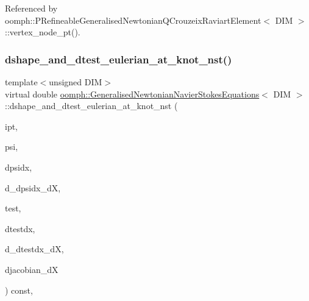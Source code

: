 Referenced by oomph\+::\+P\+Refineable\+Generalised\+Newtonian\+Q\+Crouzeix\+Raviart\+Element$<$ D\+I\+M $>$\+::vertex\+\_\+node\+\_\+pt().

\mbox{\label{classoomph_1_1GeneralisedNewtonianNavierStokesEquations_a24a93b73dba66e04eabb9b37a9360daa}} 
\subsubsection{\texorpdfstring{dshape\+\_\+and\+\_\+dtest\+\_\+eulerian\+\_\+at\+\_\+knot\+\_\+nst()}{dshape\_and\_dtest\_eulerian\_at\_knot\_nst()}\hspace{0.1cm}{\footnotesize\ttfamily [2/2]}}
{\footnotesize\ttfamily template$<$unsigned D\+IM$>$ \\
virtual double \hyperlink{classoomph_1_1GeneralisedNewtonianNavierStokesEquations}{oomph\+::\+Generalised\+Newtonian\+Navier\+Stokes\+Equations}$<$ D\+IM $>$\+::dshape\+\_\+and\+\_\+dtest\+\_\+eulerian\+\_\+at\+\_\+knot\+\_\+nst (\begin{DoxyParamCaption}\item[{const unsigned \&}]{ipt,  }\item[{\hyperlink{classoomph_1_1Shape}{Shape} \&}]{psi,  }\item[{\hyperlink{classoomph_1_1DShape}{D\+Shape} \&}]{dpsidx,  }\item[{\hyperlink{classoomph_1_1RankFourTensor}{Rank\+Four\+Tensor}$<$ double $>$ \&}]{d\+\_\+dpsidx\+\_\+dX,  }\item[{\hyperlink{classoomph_1_1Shape}{Shape} \&}]{test,  }\item[{\hyperlink{classoomph_1_1DShape}{D\+Shape} \&}]{dtestdx,  }\item[{\hyperlink{classoomph_1_1RankFourTensor}{Rank\+Four\+Tensor}$<$ double $>$ \&}]{d\+\_\+dtestdx\+\_\+dX,  }\item[{\hyperlink{classoomph_1_1DenseMatrix}{Dense\+Matrix}$<$ double $>$ \&}]{djacobian\+\_\+dX }\end{DoxyParamCaption}) const\hspace{0.3cm}{\ttfamily [protected]}, {}}



